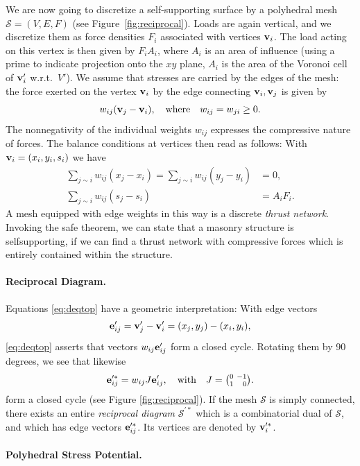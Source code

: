 \documentclass[annual]{acmsiggraph}
\def\SS{{\mathcal S}}
\begin{document}
We are now going to discretize a self-supporting surface by a polyhedral
mesh $\SS=(V,E,F)$ (see Figure~\ref{fig:reciprocal}). Loads are again
vertical, and we discretize them as force densities $F_i$ associated with
vertices ${\mathbf v}_i$. The load acting on this vertex is then given by
$F_iA_i$, where $A_i$ is an area of influence (using a prime to indicate
projection onto the $xy$ plane, $A_i$ is the area of the Voronoi cell of
${\mathbf v}_i'$ w.r.t.\ $V'$). We assume that stresses are carried by the edges
of the mesh: the force exerted on the vertex ${\mathbf v}_i$ by the edge
connecting ${\mathbf v}_i,{\mathbf v}_j$ is given by
	$$
	w_{ij} ({\mathbf v}_j-{\mathbf v}_i),
	\quad
	\text{where}\quad
	w_{ij}=w_{ji}\ge 0.
	$$
 The nonnegativity of the individual weights $w_{ij}$ expresses the
compressive nature of forces. The balance conditions at vertices then read
as follows: With ${\mathbf v}_i=(x_i,y_i,s_i)$ we have
	\begin{align}
	\sum_{j\sim i}
		w_{ij} (x_j - x_i)
	=
	\sum_{j\sim i}
		w_{ij} (y_j - y_i) &= 0,
			 \label{eq:deqtop} \\
	\sum_{j\sim i}
		w_{ij} (s_j - s_i)
		&= A_i F_i.
			\label{eq:deqz}
	\end{align}
 A mesh equipped with edge weights in this way is a discrete \emph{thrust
network}. Invoking the safe theorem, we can state that a masonry structure
is self\dash supporting, if we can find a thrust network with compressive
forces which is entirely contained within the structure.


\paragraph{Reciprocal Diagram.}

Equations \eqref{eq:deqtop} have a geometric interpretation: With edge
vectors
	$${\mathbf e}'_{ij} = {\mathbf v}_j'-{\mathbf v}_i'=(x_j, y_j) - (x_i, y_i),
	$$
 \eqref{eq:deqtop} asserts that vectors $w_{ij} {\mathbf e}_{ij}'$ form a closed
cycle. Rotating them by 90 degrees, we see that likewise
	$$
	{\mathbf e}_{ij}^{\prime *} = w_{ij} J {\mathbf e}_{ij}', \quad \text{with}\quad
	J={\textstyle{0 \ -1 \choose 1 \ \hphantom{-}0}}.
	$$
 form a closed cycle (see Figure \ref{fig:reciprocal}).
If the mesh $\SS$ is simply connected, there exists
an entire {\em reciprocal diagram} $\SS^{\prime *}$ which is a
combinatorial dual of $\SS$, and which has edge vectors ${\mathbf e}_{ij}'^*$.
 Its vertices are denoted by ${\mathbf v}_i^{\prime *}$.


\paragraph{Polyhedral Stress Potential.}
\end{document}
